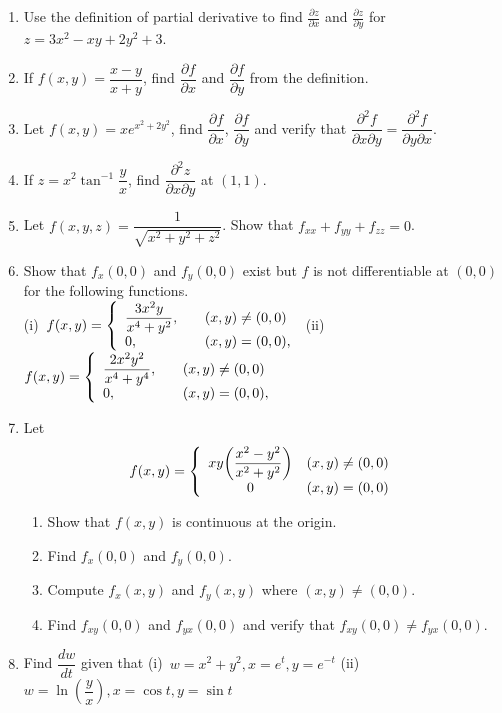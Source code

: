 \documentclass[titlepage,a4paper,12pt]{report}
\begin{document}
\begin{enumerate}
\item Use the definition of partial derivative to find $\displaystyle\frac{\partial z}{\partial x}$ and $\displaystyle\frac{\partial z}{\partial y}$ for $z=3x^2-xy+2y^2+3$.
\item If $f(x,y)=\dfrac{x-y}{x+y}$, find $\dfrac{\partial f}{\partial x}$ and $\dfrac{\partial f}{\partial y}$ from the definition.
\item Let $f(x,y)=xe^{x^2+2y^2}$, find $\dfrac{\partial f}{\partial x}$, $\dfrac{\partial f}{\partial y}$ and verify that $\dfrac{\partial^2f}{\partial x \partial y}=\dfrac{\partial^2f}{\partial y \partial x}$.
\item If $z=x^2\tan ^{-1}\dfrac{y}{x}$, find $\dfrac{\partial ^2 z}{\partial x \partial y}$ at $(1,1)$.
\item Let $f(x,y,z)=\dfrac{1}{\sqrt{x^2+y^2+z^2}}$. Show that $f_{xx}+f_{yy}+f_{zz}=0$.
\item Show that $f_x(0,0)$ and $f_y(0,0)$ exist but $f$ is not differentiable at $(0,0)$ for the following functions.\\
(i)\, $f(x,y) = \left\{ 
\begin{array}{l l}
  \dfrac{3x^2y}{x^4+y^2}, & \quad (x,y)\neq (0,0)\\
  0, & \quad (x,y)=(0,0),\\ \end{array} \right. $ \quad (ii)\, 
  $ f(x,y) = \left\{ 
\begin{array}{l l}
  \dfrac{2x^2y^2}{x^4+y^4}, & \quad (x,y)\neq (0,0)\\
  0, & \quad (x,y)=(0,0),\\ \end{array} \right. $
\item Let $$f(x,y)=\left\{\begin{array}{cc}xy\bigg(\dfrac{x^2-y^2}{x^2+y^2}\bigg)&(x,y)\neq (0,0)\cr 0&(x,y)=(0,0)\end{array} \right.$$
\begin{enumerate}
\item Show that $f(x,y)$ is continuous at the origin.
\item Find $f_{x}(0,0)$ and $f_{y}(0,0).$
\item Compute $f_{x}(x,y)$ and $f_{y}(x,y)$ where $(x,y)\neq(0,0)$.
\item Find $f_{xy}(0,0)$ and $f_{yx}(0,0)$ and verify that $f_{xy}(0,0)\neq f_{yx}(0,0)$.
\end{enumerate}
\item Find $\dfrac{dw}{dt}$ given that (i)\, $w=x^2+y^2, x=e^t, y=e^{-t}$ \quad (ii)\, $w=\ln \left(\dfrac{y}{x}\right), x=\cos t, y=\sin t$\\

\end{enumerate}
\end{document}
